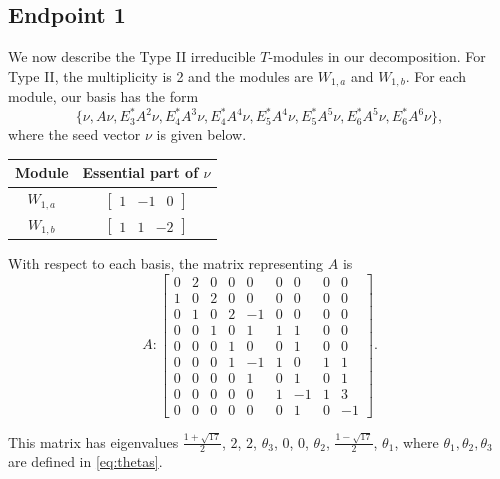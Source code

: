 \documentclass[12pt,letterpaper]{article}
\newcommand{\rowvector}[1]{\begin{bmatrix} #1 \end{bmatrix}}
\begin{document}
\subsection{Endpoint 1}

We now describe the Type II irreducible $T$-modules in our decomposition. For Type II, the multiplicity is 2 and the modules are $W_{1,a}$ and $W_{1,b}$. For each module, our basis has the form 
\begin{equation*}
    \{\nu, A\nu, E_3^*A^2\nu, E_4^*A^3\nu, E_4^*A^4\nu, E_5^*A^4\nu, E_5^*A^5\nu, E_6^*A^5\nu, E_6^*A^6\nu\},
\end{equation*} 
where the seed vector $\nu$ is given below.
\begin{center}
    \begin{tabular}{c | c}
    \toprule
       \textbf{Module}  & \textbf {Essential part of }$\nu$ \\
       \midrule
       $W_{1,a}$  & $\rowvector{1 & -1 & 0}$ \\[1.67pt]
       $W_{1,b}$  & $\rowvector{1 & 1 & -2}$ \\
    \bottomrule
    \end{tabular}
\end{center}

With respect to each basis, the matrix representing $A$ is 
\begin{equation}
    A: \begin{bmatrix}
  0 & 2 & 0 & 0 & 0 & 0 & 0 & 0 & 0 \\
  1 & 0 & 2 & 0 & 0 & 0 & 0 & 0 & 0 \\
  0 & 1 & 0 & 2 & -1 & 0 & 0 & 0 & 0 \\
  0 & 0 & 1 & 0 & 1 & 1 & 1 & 0 & 0 \\
  0 & 0 & 0 & 1 & 0 & 0 & 1 & 0 & 0 \\
  0 & 0 & 0 & 1 & -1 & 1 & 0 & 1 & 1 \\
  0 & 0 & 0 & 0 & 1 & 0 & 1 & 0 & 1\\
  0 & 0 & 0 & 0 & 0 & 1 & -1 & 1 & 3 \\
  0 & 0 & 0 & 0 & 0 & 0 & 1 & 0 & -1 \end{bmatrix}.
\label{eq:bs-II}
\end{equation}

This matrix has eigenvalues $\frac{1+\sqrt{17}}{2}$, $2$, $2$, $\theta_3$, $0$, $0$, $\theta_2$, $\frac{1-\sqrt{17}}{2}$, $\theta_1$, where $\theta_1, \theta_2, \theta_3 $ are defined in \eqref{eq:thetas}.
\end{document}
